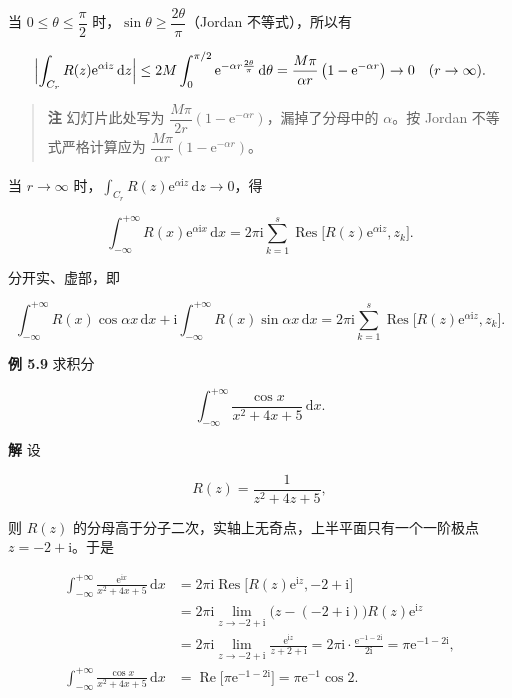 当 \(0\le\theta\le\dfrac{\pi}{2}\)
时，\(\sin\theta\ge\dfrac{2\theta}{\pi}\)（Jordan 不等式），所以有

\[
\Bigl|\int_{C_r}R(z)\mathrm e^{\alpha\mathrm i z}\,\mathrm dz\Bigr|
\le2M\int_{0}^{\pi/2}\mathrm e^{-\alpha r\frac{2\theta}{\pi}}\,\mathrm d\theta
=\frac{M\pi}{\alpha r}\,\bigl(1-\mathrm e^{-\alpha r}\bigr)\to0\quad(r\to\infty).
\]

\begin{quote}
\textbf{注} 幻灯片此处写为
\(\dfrac{M\pi}{2r}(1-\mathrm e^{-\alpha r})\)，漏掉了分母中的
\(\alpha\)。按 Jordan 不等式严格计算应为
\(\dfrac{M\pi}{\alpha r}(1-\mathrm e^{-\alpha r})\)。
\end{quote}

当 \(r\to\infty\)
时，\(\displaystyle\int_{C_r}R(z)\mathrm e^{\alpha\mathrm i z}\,\mathrm dz\to0\)，得

\[
\boxed{\displaystyle\int_{-\infty}^{+\infty}R(x)\mathrm e^{\alpha\mathrm i x}\,\mathrm dx
=2\pi\mathrm i\sum_{k=1}^{s}\operatorname{Res}\bigl[R(z)\mathrm e^{\alpha\mathrm i z},z_k\bigr]} .
\]

分开实、虚部，即

\[
\int_{-\infty}^{+\infty}R(x)\cos\alpha x\,\mathrm dx
+\mathrm i\int_{-\infty}^{+\infty}R(x)\sin\alpha x\,\mathrm dx
=2\pi\mathrm i\sum_{k=1}^{s}\operatorname{Res}\bigl[R(z)\mathrm e^{\alpha\mathrm i z},z_k\bigr].
\]

\textbf{例 5.9} 求积分

\[
\int_{-\infty}^{+\infty}\frac{\cos x}{x^{2}+4x+5}\,\mathrm dx .
\]

\textbf{解} 设

\[
R(z)=\frac{1}{z^{2}+4z+5},
\]

则 \(R(z)\) 的分母高于分子二次，实轴上无奇点，上半平面只有一个一阶极点
\(z=-2+\mathrm i\)。于是

\[
\begin{aligned}
\int_{-\infty}^{+\infty}\frac{\mathrm e^{\mathrm i x}}{x^{2}+4x+5}\,\mathrm dx
&=2\pi\mathrm i\operatorname{Res}\bigl[R(z)\mathrm e^{\mathrm i z},-2+\mathrm i\bigr]\\
&=2\pi\mathrm i\lim_{z\to-2+\mathrm i}\bigl(z-(-2+\mathrm i)\bigr)R(z)\mathrm e^{\mathrm i z}\\
&=2\pi\mathrm i\lim_{z\to-2+\mathrm i}\frac{\mathrm e^{\mathrm i z}}{z+2+\mathrm i}
=2\pi\mathrm i\cdot\frac{\mathrm e^{-1-2\mathrm i}}{2\mathrm i}
=\pi\mathrm e^{-1-2\mathrm i},\\
\int_{-\infty}^{+\infty}\frac{\cos x}{x^{2}+4x+5}\,\mathrm dx
&=\operatorname{Re}\bigl[\pi\mathrm e^{-1-2\mathrm i}\bigr]
=\pi\mathrm e^{-1}\cos 2 .
\end{aligned}
\]

